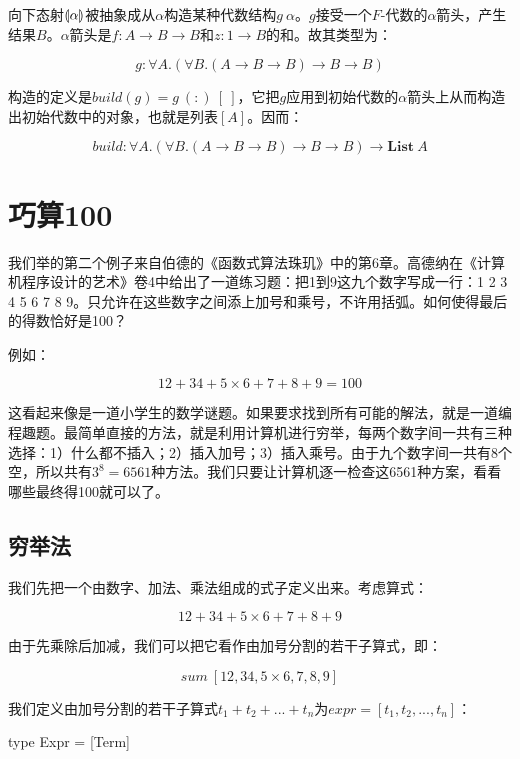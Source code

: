 \documentclass[b5paper]{ctexart}
\begin{document}
\begin{Answer}[ref = {ex:fusion-law}]
{向下态射$\llparenthesis \alpha \rrparenthesis$被抽象成从$\alpha$构造某种代数结构$g\ \alpha$。$g$接受一个$F$-代数的$\alpha$箭头，产生结果$B$。$\alpha$箭头是$f : A \to B \to B$和$z : 1 \to B$的和。故其类型为：

\[
g : \forall A. (\forall B. (A \to B \to B) \to B \to B)
\]

构造的定义是$build(g) = g\ (:)\ [\ ]$，它把$g$应用到初始代数的$\alpha$箭头上从而构造出初始代数中的对象，也就是列表$[A]$。因而：

\[
build : \forall A. (\forall B. (A \to B \to B) \to B \to B) \to \mathbf{List}\ A
\]
}
\end{Answer}

\section{巧算100}

我们举的第二个例子来自伯德的《函数式算法珠玑》中的第6章\cite{Bird-2010}。高德纳在《计算机程序设计的艺术》卷4中给出了一道练习题\cite{Knuth-TAOCP-2006}：把1到9这九个数字写成一行：1 2 3 4 5 6 7 8 9。只允许在这些数字之间添上加号和乘号，不许用括弧。如何使得最后的得数恰好是100？

例如：

\[
12 + 34 + 5 \times 6 + 7 + 8 + 9 = 100
\]

这看起来像是一道小学生的数学谜题。如果要求找到所有可能的解法，就是一道编程趣题。最简单直接的方法，就是利用计算机进行穷举，每两个数字间一共有三种选择：1）什么都不插入；2）插入加号；3）插入乘号。由于九个数字间一共有8个空，所以共有$3^8 = 6561$种方法。我们只要让计算机逐一检查这6561种方案，看看哪些最终得100就可以了。

\subsection{穷举法}

我们先把一个由数字、加法、乘法组成的式子定义出来。考虑算式：

\[
12 + 34 + 5 \times 6 + 7 + 8 + 9
\]

由于先乘除后加减，我们可以把它看作由加号分割的若干子算式，即：

\[
sum\ [12, 34, 5 \times 6, 7, 8, 9]
\]

我们定义由加号分割的若干子算式$t_1 + t_2 + ... + t_n$为$expr = [t_1, t_2, ..., t_n]$：

\lstset{frame = single}
\begin{Haskell}
type Expr = [Term]
\end{Haskell}
\end{document}
